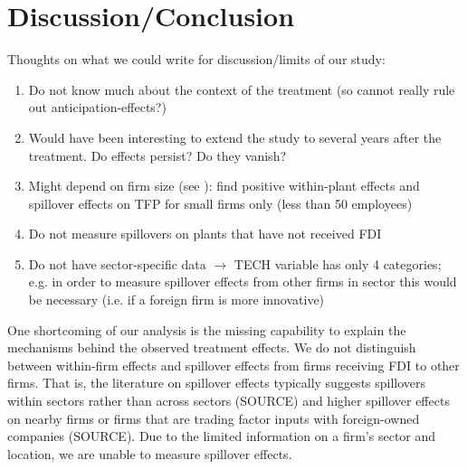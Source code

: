 \documentclass[a4paper,11pt]{scrartcl}
\newcommand{\comment}[1]{}
\begin{document}
\section{Discussion/Conclusion}



\comment{
For citation: \\
you have to add your reference firstly in bibCG. After having done so you can always include the reference in the actual file as follows: \\
 \citet{aitken99}\\
\citep[p.~35]{CaliendoHujerThomsen2008}	}

Thoughts on what we could write for discussion/limits of our study: 
\begin{enumerate}
\item Do not know much about the context of the treatment (so cannot really rule out anticipation-effects?)
\item Would have been interesting to extend the study to several years after the treatment. Do effects persist? Do they vanish? 
\item Might depend on firm size (see \citet{aitken99}): find positive within-plant effects and spillover effects on TFP for small firms only (less than 50 employees)
\item Do not measure spillovers on plants that have not received FDI
\item Do not have sector-specific data $\rightarrow$ TECH variable has only 4 categories; e.g. in order to measure spillover effects from other firms in sector this would be necessary (i.e. if a foreign firm is more innovative)
\end{enumerate}

One shortcoming of our analysis is the missing capability to explain the mechanisms behind the observed treatment effects. We do not distinguish between within-firm effects and spillover effects from firms receiving FDI to other firms. That is, the literature on spillover effects typically suggests spillovers within sectors rather than across sectors (SOURCE) and higher spillover effects on nearby firms or firms that are trading factor inputs with foreign-owned companies (SOURCE). Due to the limited information on a firm's sector and location, we are unable to measure spillover effects. 

\newpage

 
\newpage
\end{document}
